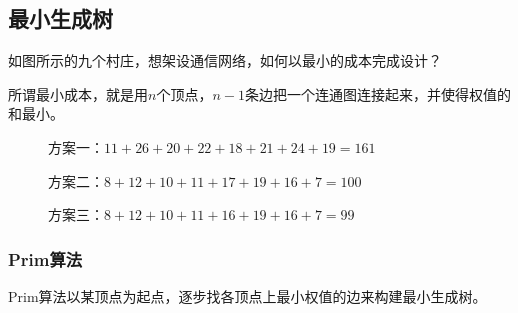 \subsection{最小生成树}
\begin{frame}\ft{\subsecname}
  \begin{small}
\begin{wenti}
如图所示的九个村庄，想架设通信网络，如何以最小的成本完成设计？
\end{wenti}	
\begin{figure}
\centering

\end{figure}

所谓最小成本，就是用$n$个顶点，$n-1$条边把一个连通图连接起来，并使得权值的和最小。
    
  \end{small}
\end{frame}

\begin{frame}\ft{\subsecname}
\begin{figure}
\centering

\caption{方案一：$11+26+20+22+18+21+24+19=161$}
\end{figure}
\end{frame}

\begin{frame}\ft{\subsecname}
\begin{figure}
\centering

\caption{方案二：$8+12+10+11+17+19+16+7=100$}
\end{figure}
\end{frame}

\begin{frame}\ft{\subsecname}
\begin{figure}
\centering

\caption{方案三：$8+12+10+11+16+19+16+7=99$}
\end{figure}
\end{frame}

\subsubsection{\tf Prim算法}
\begin{frame}\ft{\subsubsecname}
\tf Prim算法以某顶点为起点，逐步找各顶点上最小权值的边来构建最小生成树。
\end{frame}

\begin{frame}\ft{\subsubsecname}
\begin{figure}
\centering

\end{figure}
\end{frame}

